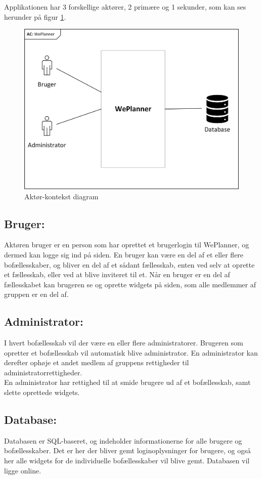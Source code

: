 Applikationen har 3 forskellige aktører, 2 primære og 1 sekunder, som kan ses herunder på figur \ref{fig:aktor_konteks}.
\begin{figure}[h]
  \includegraphics[width=\linewidth]{Kravspecifikation/Images/Aktor-kontekst_diagram.png}
  \caption{Aktør-kontekst diagram}
  \label{fig:aktor_konteks}
\end{figure}

\subsection{Bruger:}
Aktøren bruger er en person som har oprettet et brugerlogin til WePlanner, og dermed kan logge sig ind på siden. En bruger kan være en del af et eller flere bofællesskaber, og bliver en del af et sådant fællesskab, enten ved selv at oprette et fællesskab, eller ved at blive inviteret til et. Når en bruger er en del af fællesskabet kan brugeren se og oprette widgets på siden, som alle medlemmer af gruppen er en del af. 

\subsection{Administrator:}
I hvert bofællesskab vil der være en eller flere administratorer. Brugeren som opretter et bofællesskab vil automatisk blive administrator. En administrator kan derefter ophøje et andet medlem af gruppens rettigheder til administratorrettigheder. \\
En administrator har rettighed til at smide brugere ud af et bofællesskab, samt slette oprettede widgets.

\subsection{Database:}
Databasen er SQL-baseret, og indeholder informationerne for alle brugere og bofællesskaber. Det er her der bliver gemt loginoplysninger for brugere, og også her alle widgets for de individuelle bofællesskaber vil blive gemt. Databasen vil ligge online.